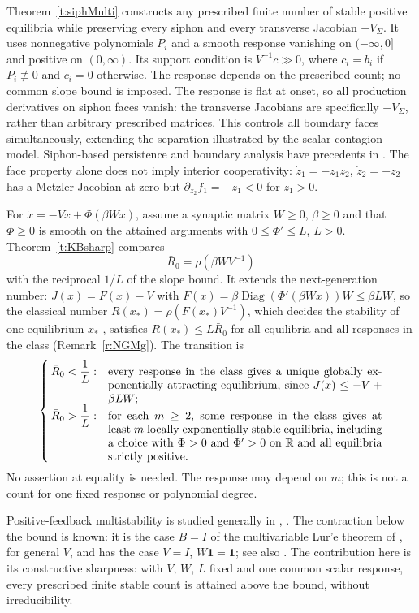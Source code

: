 \begin{enumerate}
Theorem~\ref{t:siphMulti} constructs any prescribed finite number
of stable positive equilibria while preserving every siphon and every
transverse Jacobian $-V_\Sigma$. It uses nonnegative polynomials
$P_i$ and a smooth response vanishing on $(-\infty,0]$ and
positive on $(0,\infty)$. Its support condition is $V^{-1}c\gg0$,
where $c_i=b_i$ if $P_i\not\equiv0$ and $c_i=0$ otherwise.
The response depends on the prescribed count; no common slope bound
is imposed. The response is flat at onset, so all production derivatives on
siphon faces vanish: the transverse Jacobians are specifically
$-V_\Sigma$, rather than arbitrary prescribed matrices. This controls all boundary faces simultaneously, extending
the separation illustrated by the scalar contagion model. Siphon-based
persistence and boundary analysis have precedents in \cite{AdLS}.
The face property alone does not imply interior cooperativity:
$\dot z_1=-z_1z_2$, $\dot z_2=-z_2$ has a Metzler Jacobian at zero
but $\partial_{z_2}f_1=-z_1<0$ for $z_1>0$.

For $\dot x=-Vx+\Phi(\beta Wx)$, assume a synaptic matrix $W\ge0$, $\beta\ge0$ and
that $\Phi\ge0$ is smooth on the attained arguments with $0\le \Phi'\le L$,
$L>0$. Theorem~\ref{t:KBsharp} compares
\[
 \bar R_0=\rho(\beta WV^{-1})
\]
with the reciprocal $1/L$ of the slope bound.
It extends the next-generation number: $J(x)=F(x)-V$ with
$F(x)=\beta\operatorname{Diag}(\Phi'(\beta Wx))W\le\beta LW$, so the classical number
$R(x_*)=\rho(F(x_*)V^{-1})$, which decides the stability of one equilibrium $x_*$ \cite{Van}, satisfies
$R(x_*)\le L\bar R_0$ for all equilibria and all responses in the class (Remark~\ref{r:NGMg}).
The transition is
\[
 \begin{cases}
 \bar R_0<\dfrac1L: & \parbox[t]{.7\linewidth}{every response in the class gives a unique globally exponentially attracting equilibrium, since $J(x)\le-V+\beta LW$;}\\[12pt]
 \bar R_0>\dfrac1L: & \parbox[t]{.7\linewidth}{for each $m\ge2$, some response in the class gives at least $m$ locally exponentially stable equilibria, including a choice with $\Phi>0$ and $\Phi'>0$ on $\mathbb R$ and all equilibria strictly positive.}
 \end{cases}
\]
No assertion at equality is needed. The response may depend on $m$;
this is not a count for one fixed response or polynomial degree.

Positive-feedback multistability is studied generally in
\cite{AngeliSontag2004}, \cite{AngeliFerrellSontag2004}.
The contraction below the bound is known: it is the case $B=I$
of the multivariable Lur'e theorem of \cite{Davydov}, for general $V$,
and \cite{Boud26} has the case $V=I$, $W\mathbf1=\mathbf1$; see also
\cite{Coogan2019,KawanoBesselinkCao2020}. The contribution here is its
constructive sharpness: with $V$, $W$, $L$ fixed and one common scalar response, every
prescribed finite stable count is attained above the bound, without irreducibility.


\end{enumerate}
